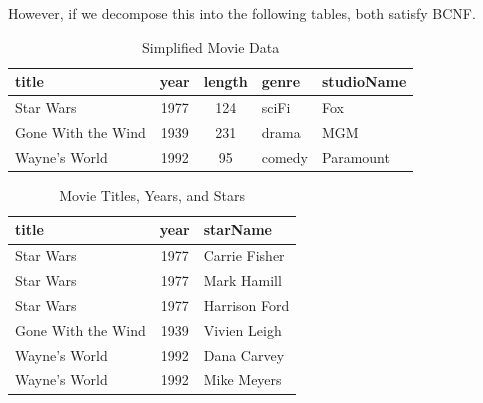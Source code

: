   \begin{example}
    \label{ex:bncf-form}
    However, if we decompose this into the following tables, both satisfy BCNF. 

    \begin{table}[H]
      \centering
      \begin{tabular}{|l|c|c|l|l|}
      \hline
      \textbf{title} & \textbf{year} & \textbf{length} & \textbf{genre} & \textbf{studioName} \\
      \hline
      Star Wars & 1977 & 124 & sciFi & Fox \\
      Gone With the Wind & 1939 & 231 & drama & MGM \\
      Wayne's World & 1992 & 95 & comedy & Paramount \\
      \hline
      \end{tabular}
      \caption{Simplified Movie Data}
      \label{tab:simplemoviedata}
    \end{table}

    \begin{table}[H]
      \centering
      \begin{tabular}{|l|c|l|}
      \hline
      \textbf{title} & \textbf{year} & \textbf{starName} \\
      \hline
      Star Wars & 1977 & Carrie Fisher \\
      Star Wars & 1977 & Mark Hamill \\
      Star Wars & 1977 & Harrison Ford \\
      Gone With the Wind & 1939 & Vivien Leigh \\
      Wayne's World & 1992 & Dana Carvey \\
      Wayne's World & 1992 & Mike Meyers \\
      \hline
      \end{tabular}
      \caption{Movie Titles, Years, and Stars}
      \label{tab:moviestars}
    \end{table}
  \end{example}

